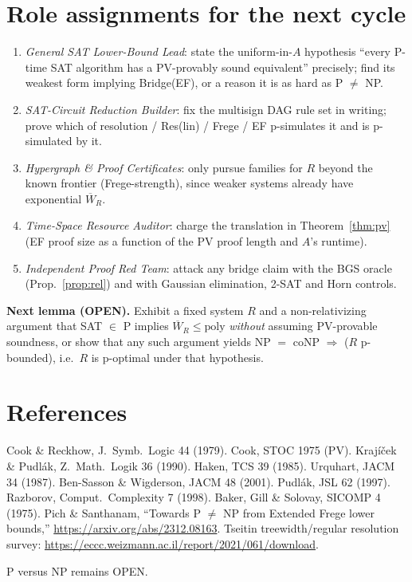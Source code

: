 \documentclass[11pt]{article}
\theoremstyle{remark}
\newcommand{\Wbar}{\overline{W}}
\begin{document}
\section{Role assignments for the next cycle}
\begin{enumerate}
\item \emph{General SAT Lower-Bound Lead}: state the uniform-in-$A$ hypothesis
``every P-time SAT algorithm has a PV-provably sound equivalent'' precisely; find its weakest
form implying Bridge(EF), or a reason it is as hard as P $\neq$ NP.
\item \emph{SAT-Circuit Reduction Builder}: fix the multisign DAG rule set in writing; prove which
of resolution / Res(lin) / Frege / EF p-simulates it and is p-simulated by it.
\item \emph{Hypergraph \& Proof Certificates}: only pursue families for $R$ beyond the known
frontier (Frege-strength), since weaker systems already have exponential $\Wbar_R$.
\item \emph{Time-Space Resource Auditor}: charge the translation in Theorem~\ref{thm:pv}
(EF proof size as a function of the PV proof length and $A$'s runtime).
\item \emph{Independent Proof Red Team}: attack any bridge claim with the BGS oracle
(Prop.~\ref{prop:rel}) and with Gaussian elimination, 2-SAT and Horn controls.
\end{enumerate}

\noindent\textbf{Next lemma (OPEN).} Exhibit a fixed system $R$ and a non-relativizing argument
that SAT $\in$ P implies $\Wbar_R\le\mathrm{poly}$ \emph{without} assuming PV-provable soundness,
or show that any such argument yields NP $=$ coNP $\Rightarrow$ ($R$ p-bounded), i.e.\ $R$ is
p-optimal under that hypothesis.

\section*{References}
\small
Cook \& Reckhow, J.\ Symb.\ Logic 44 (1979). Cook, STOC 1975 (PV). Kraj\'i\v{c}ek \& Pudl\'ak,
Z.\ Math.\ Logik 36 (1990). Haken, TCS 39 (1985). Urquhart, JACM 34 (1987). Ben-Sasson \&
Wigderson, JACM 48 (2001). Pudl\'ak, JSL 62 (1997). Razborov, Comput.\ Complexity 7 (1998).
Baker, Gill \& Solovay, SICOMP 4 (1975). Pich \& Santhanam, ``Towards P $\neq$ NP from
Extended Frege lower bounds,'' \url{https://arxiv.org/abs/2312.08163}.
Tseitin treewidth/regular resolution survey: \url{https://eccc.weizmann.ac.il/report/2021/061/download}.

\medskip\noindent P versus NP remains OPEN.
\end{document}
